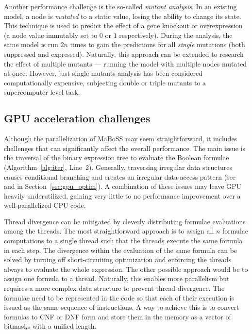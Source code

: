 Another performance challenge is the so-called \emph{mutant analysis}. In an existing model, a node is \emph{mutated} to a static value, losing the ability to change its state. This technique is used to predict the effect of a gene knockout or overexpression (a node value immutably set to $0$ or $1$ respectively). During the analysis, the same model is run $2n$ times to gain the predictions for all \emph{single} mutations (both suppressed and expressed). Naturally, this approach can be extended to research the effect of multiple mutants --- running the model with multiple nodes mutated at once. However, just single mutants analysis has been considered computationally expensive, subjecting double or triple mutants to a supercomputer-level task.

\subsection{GPU acceleration challenges}

Although the parallelization of MaBoSS may seem straightforward, it includes challenges that can significantly affect the overall performance. The main issue is the traversal of the binary expression tree to evaluate the Boolean formulae (Algorithm~\ref{alg:iter}, Line~2). Generally, traversing irregular data structures causes conditional branching and creates an irregular data access pattern (see  and  in Section~\ref{sec:gpu_optim}). A combination of these issues may leave GPU heavily underutilized, gaining very little to no performance improvement over a well-parallelized CPU code.

Thread divergence can be mitigated by cleverly distributing formulae evaluations among the threads. The most straightforward approach is to assign all $n$ formulae computations to a single thread such that the threads execute the same formula in each step. The divergence within the evaluation of the same formula can be solved by turning off short-circuiting optimization and enforcing the threads always to evaluate the whole expression.
The other possible approach would be to assign one formula to a thread. Naturally, this enables more parallelism but requires a more complex data structure to prevent thread divergence. The formulae need to be represented in the code so that each of their execution is issued as the same sequence of instructions. A way to achieve this is to convert formulas to CNF or DNF form and store them in the memory as a vector of bitmasks with a unified length.

